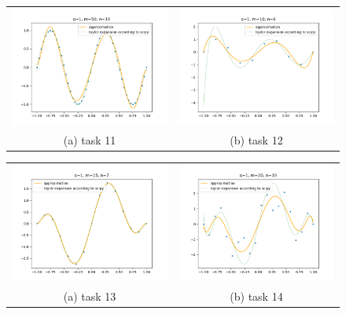 \documentclass[12pt, a4paper, parskip=half]{scrartcl}
\begin{document}
\begin{enumerate}[leftmargin=0.5cm, label=(\roman*)]
        \begin{figure}
            \begin{tabular}{cc}
                \includegraphics[width=72mm]{task_11} &   \includegraphics[width=72mm]{task_12} \\
                (a) task 11 & (b) task 12 \\[6pt]
            \end{tabular}
        \end{figure}

        \begin{figure}  
            \begin{tabular}{cc}
                \includegraphics[width=72mm]{task_13} &   \includegraphics[width=72mm]{task_14} \\
                (a) task 13 & (b) task 14 \\[6pt]
            \end{tabular}
        \end{figure}
            

\end{enumerate}
\end{document}
